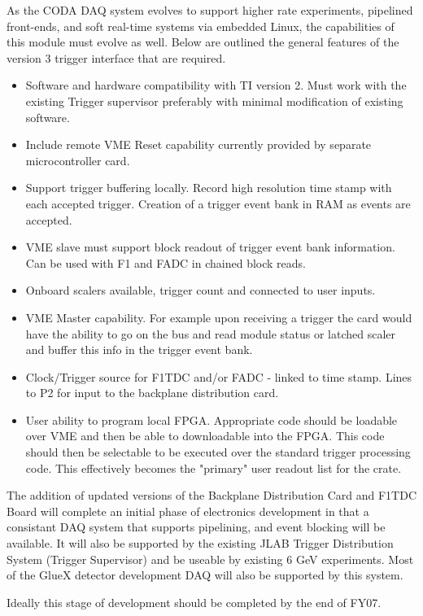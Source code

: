 \documentclass[10pt]{article}
\begin{document}
As the CODA DAQ system evolves to support higher rate experiments, pipelined 
front-ends, and soft real-time systems via embedded Linux, the capabilities 
of this module must evolve as well. Below are outlined the general features 
of the version 3 trigger interface that are required.

\begin{itemize}
\item Software and hardware compatibility with TI version 2. Must work with the 
existing Trigger supervisor preferably with minimal modification of existing 
software.
\item Include remote VME Reset capability currently provided by separate 
microcontroller card.
\item Support trigger buffering locally. Record high resolution time stamp with 
each accepted trigger. Creation of a trigger event bank in RAM as events are 
accepted.
\item VME slave must support block readout of trigger event bank information. 
Can be used with F1 and FADC in chained block reads.
\item Onboard scalers available, trigger count and connected to user inputs.
\item VME Master capability. For example upon receiving a trigger the card would 
have the ability to go on the bus and read module status or latched scaler 
and buffer this info in the trigger event bank.
\item Clock/Trigger source for F1TDC and/or FADC - linked to time stamp. Lines to 
P2 for input to the backplane distribution card. 
\item User ability to program local FPGA. Appropriate code should be loadable 
over VME and then be able to downloadable into the FPGA. This code should 
then be selectable to be executed over the standard trigger processing code. 
This effectively becomes the "primary" user readout list for the crate.
\end{itemize}

The addition of updated versions of the Backplane Distribution Card and F1TDC Board 
will complete an initial phase of electronics development in that a consistant DAQ
system that supports pipelining, and event blocking will be available. It will also
be supported by the existing JLAB Trigger Distribution System (Trigger Supervisor) and
be useable by existing 6 GeV experiments. Most of the GlueX detector development DAQ
will also be supported by this system.

Ideally this stage of development should be completed by the end of FY07.
\end{document}
